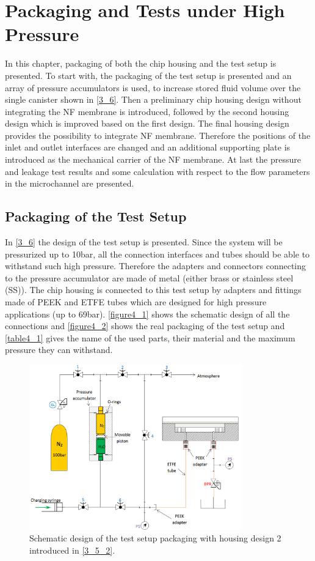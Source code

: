 \chapter{Packaging and Tests under High Pressure}
\label{4}
In this chapter, packaging of both the chip housing and the test setup is presented. To start with, the packaging of the test setup is presented and an array of pressure accumulators is used, to increase stored fluid volume over the single canister shown in \autoref{3_6}. Then a preliminary chip housing design without integrating the NF membrane is introduced, followed by the second housing design which is improved based on the first design. The final housing design provides the possibility to integrate NF membrane. Therefore the positions of the inlet and outlet interfaces are changed and an additional supporting plate is introduced as the mechanical carrier of the NF membrane. At last the pressure and leakage test results and some calculation with respect to the flow parameters in the microchannel are presented.

\section{Packaging of the Test Setup}
\label{4_1}
In \autoref{3_6} the design of the test setup is presented. Since the system will be pressurized up to 10bar, all the connection interfaces and tubes should be able to withstand such high pressure. Therefore the adapters and connectors connecting to the pressure accumulator are made of metal (either brass or stainless steel (SS)). The chip housing is connected to this test setup by adapters and fittings made of PEEK and ETFE tubes which are designed for high pressure applications (up to 69bar). \autoref{figure4_1} shows the schematic design of all the connections and \autoref{figure4_2} shows the real packaging of the test setup and \autoref{table4_1} gives the name of the used parts, their material and the maximum pressure they can withstand.\\
\clearpage

\begin{figure}[h]%
\centering
\includegraphics[width=0.82\textwidth]{figures/packagingandtestunderhighpressure/figure4_1}%
\caption{Schematic design of the test setup packaging with housing design 2 introduced in \autoref{3_5_2}.}%
\label{figure4_1}%
\end{figure}

